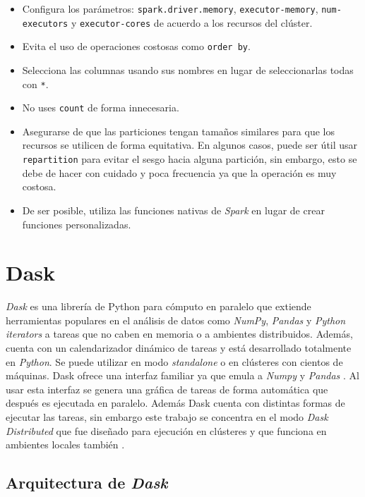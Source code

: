 \begin{itemize}
	\item Configura los parámetros: \texttt{spark.driver.memory}, \texttt{executor-memory}, \texttt{num-executors} y \texttt{executor-cores} de acuerdo a los recursos del clúster.
	\item Evita el uso de operaciones costosas como \texttt{order by}. 
	\item Selecciona las columnas usando sus nombres en lugar de seleccionarlas todas con \texttt{*}.
	\item No uses \texttt{count} de forma innecesaria.
	\item Asegurarse de que las particiones tengan tamaños similares para que los recursos se utilicen de forma equitativa. En algunos casos, puede ser útil usar \texttt{repartition} para evitar el sesgo hacia alguna partición, sin embargo, esto se debe de hacer con cuidado y poca frecuencia ya que la operación es muy costosa.
	\item De ser posible, utiliza las funciones nativas de \textit{Spark} en lugar de crear funciones personalizadas.
	 	
\end{itemize}

\section{Dask}

\textit{Dask} es una librería de Python para cómputo en paralelo que extiende herramientas populares en el análisis de datos como \textit{NumPy}, \textit{Pandas} y \textit{Python iterators} a tareas que no caben en memoria o a ambientes distribuidos. Además, cuenta con un calendarizador dinámico de tareas y está desarrollado totalmente en \textit{Python}. Se puede utilizar en modo \textit{standalone} o en clústeres con cientos de máquinas. Dask ofrece una interfaz familiar ya que emula a \textit{Numpy} y \textit{Pandas} \cite{daskdocs}. Al usar esta interfaz se genera una gráfica de tareas de forma automática que después es ejecutada en paralelo. Además Dask cuenta con distintas formas de ejecutar las tareas, sin embargo este trabajo se concentra en el modo \textit{Dask Distributed} que fue diseñado para ejecución en clústeres y que funciona en ambientes locales también \cite{daskscheduling}.

\subsection{Arquitectura de \textit{Dask}}

